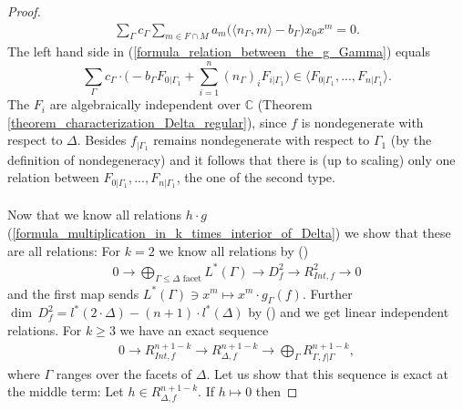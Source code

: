 \documentclass[12pt, english]{article}
\begin{document}
\begin{proof}
\begin{align}
		\sum\limits_{\Gamma} c_{\Gamma} \sum\limits_{m \in F \cap M} a_m \big( \langle n_{\Gamma},m \rangle - b_{\Gamma} \big) x_0x^m = 0.
	\end{align}
	The left hand side in (\ref{formula_relation_between_the_g_Gamma}) equals
	\[ \sum\limits_{\Gamma} c_{\Gamma} \cdot \big( -b_{\Gamma} F_{0 \vert{\Gamma_1}} + \sum\limits_{i=1}^n (n_{\Gamma})_i F_{i \vert{\Gamma_1}} \big) \in    \langle F_{0 \vert{\Gamma_1}},...,F_{n \vert{\Gamma_1}} \rangle.  \]
	The $F_{i}$ are algebraically independent over $\mathbb{C}$ (Theorem \ref{theorem_characterization_Delta_regular}), since $f$ is nondegenerate with respect to $\Delta$. Besides $f_{\vert{\Gamma_1}}$ remains nondegenerate with respect to $\Gamma_1$ (by the definition of nondegeneracy) and it follows that there is (up to scaling) only one relation between $F_{0 \vert{\Gamma_1}},...,F_{n \vert{\Gamma_1}}$, the one of the second type. \\ \\
	Now that we know all relations $h \cdot g$ (\ref{formula_multiplication_in_k_times_interior_of_Delta}) we show that these are all relations: For $k=2$ we know all relations by (\cite[Thm.9.8]{Bat93})
	\begin{align*}
		0 \rightarrow \bigoplus\limits_{\Gamma \leq \Delta \textrm{ facet}} L^*(\Gamma) \rightarrow D_f^2 \rightarrow R_{Int,f}^2 \rightarrow 0
	\end{align*}
	and the first map sends $L^*(\Gamma) \ni x^m \mapsto x^m \cdot g_{\Gamma}(f)$. Further $\dim \, D_f^2 = l^*(2 \cdot \Delta) - (n+1) \cdot l^*(\Delta)$ by (\cite[Thm.2.0.11, Rem.2.0.13, Prop.9.0.4]{Bat93}) and we get linear independent relations. For $k \geq 3$ we have an exact sequence
	\begin{align*}
		0 \rightarrow R_{Int,f}^{n+1-k} \rightarrow R_{\Delta,f}^{n+1-k} \rightarrow \bigoplus\limits_{\Gamma} R_{\Gamma,f \vert{\Gamma}}^{n+1-k},
	\end{align*}
	where $\Gamma$ ranges over the facets of $\Delta$. Let us show that this sequence is exact at the middle term: Let $h \in R_{\Delta,f}^{n+1-k}$. If $h \mapsto 0$ then

\end{proof}
\end{document}
